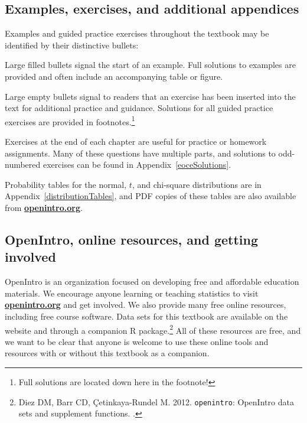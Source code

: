 \pagebreak

\subsection*{Examples, exercises, and additional appendices}

Examples and guided practice exercises throughout the textbook may be identified by their distinctive bullets:

\begin{example}{Large filled bullets signal the start of an example.}
Full solutions to examples are provided and often include an accompanying table or figure.
 \end{example}

\begin{exercise}
Large empty bullets signal to readers that an exercise has been inserted into the text for additional practice and guidance. Solutions for all guided practice exercises are provided in footnotes.\footnote{Full solutions are located down here in the footnote!}
\end{exercise}

Exercises at the end of each chapter are useful for practice or homework assignments. Many of these questions have multiple parts, and solutions to odd-numbered exercises can be found in Appendix~\ref{eoceSolutions}. %

Probability tables for the normal, $t$, and chi-square distributions are in Appendix~\ref{distributionTables}, and PDF copies of these tables are also available from \href{http://www.openintro.org}{\color{black}\textbf{openintro.org}}.

\subsection*{OpenIntro, online resources, and getting involved}

OpenIntro is an organization focused on developing free and affordable education materials.
We encourage anyone learning or teaching statistics to visit \href{http://www.openintro.org}{\color{black}\textbf{openintro.org}} and get involved. We also provide many free online resources, including free course software. 
Data sets for this textbook are available on the website and through a companion R package.\footnote{Diez DM, Barr CD, \c{C}etinkaya-Rundel M. 2012. \texttt{openintro}: OpenIntro data sets and supplement functions. .} All of these resources are free, and we want to be clear that anyone is welcome to use these online tools and resources with or without this textbook as a companion.

